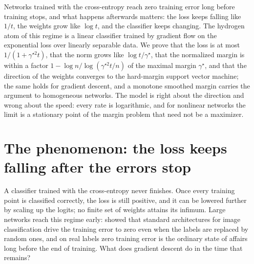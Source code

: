 \newcommand{\marginu}{u^\star}
\newcommand{\marginwhat}{\hat w}
\newcommand{\marginwt}{\tilde w}
\newcommand{\marginsm}{\tilde\gamma}
\newcommand{\marginS}{\mathcal S}

\begin{refsection}

\begin{chaptersummary}
Networks trained with the cross-entropy reach zero training error long before training stops, and what happens afterwards matters: the loss keeps falling like $1/t$, the weights grow like $\log t$, and the classifier keeps changing. The hydrogen atom of this regime is a linear classifier trained by gradient flow on the exponential loss over linearly separable data. We prove that the loss is at most $1/(1+\gamma^{\star2}t)$, that the norm grows like $\log t/\gamma^\star$, that the normalized margin is within a factor $1-\log n/\log(\gamma^{\star2}t/n)$ of the maximal margin $\gamma^\star$, and that the direction of the weights converges to the hard-margin support vector machine; the same holds for gradient descent, and a monotone smoothed margin carries the argument to homogeneous networks. The model is right about the direction and wrong about the speed: every rate is logarithmic, and for nonlinear networks the limit is a stationary point of the margin problem that need not be a maximizer.
\end{chaptersummary}

\section{The phenomenon: the loss keeps falling after the errors stop}\label{sec:margin:phenomenon}

A classifier trained with the cross-entropy never finishes. Once every training point is classified correctly, the loss is still positive, and it can be lowered further by scaling up the logits; no finite set of weights attains its infimum. Large networks reach this regime early: \textcite{ZhangEtAl2017} showed that standard architectures for image classification drive the training error to zero even when the labels are replaced by random ones, and on real labels zero training error is the ordinary state of affairs long before the end of training. What does gradient descent do in the time that remains?


\end{refsection}
